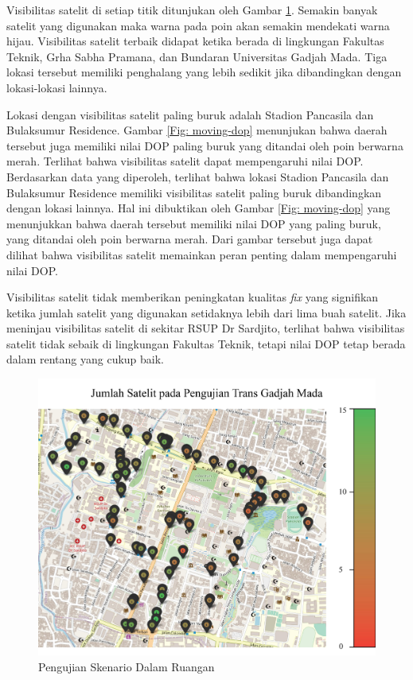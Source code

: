 Visibilitas satelit di setiap titik ditunjukan oleh Gambar \ref{Fig: moving-sats}. Semakin banyak satelit yang digunakan maka warna pada poin akan semakin mendekati warna hijau. Visibilitas satelit terbaik didapat ketika berada di lingkungan Fakultas Teknik, Grha Sabha Pramana, dan Bundaran Universitas Gadjah Mada. Tiga lokasi tersebut memiliki penghalang yang lebih sedikit jika dibandingkan dengan lokasi-lokasi lainnya.

Lokasi dengan visibilitas satelit paling buruk adalah Stadion Pancasila dan Bulaksumur Residence. Gambar \ref{Fig: moving-dop} menunjukan bahwa daerah tersebut juga memiliki nilai DOP paling buruk yang ditandai oleh poin berwarna merah. Terlihat bahwa visibilitas satelit dapat mempengaruhi nilai DOP. Berdasarkan data yang diperoleh, terlihat bahwa lokasi Stadion Pancasila dan Bulaksumur Residence memiliki visibilitas satelit paling buruk dibandingkan dengan lokasi lainnya. Hal ini dibuktikan oleh Gambar \ref{Fig: moving-dop} yang menunjukkan bahwa daerah tersebut memiliki nilai DOP yang paling buruk, yang ditandai oleh poin berwarna merah. Dari gambar tersebut juga dapat dilihat bahwa visibilitas satelit memainkan peran penting dalam mempengaruhi nilai DOP. 

Visibilitas satelit tidak memberikan peningkatan kualitas \textit{fix} yang signifikan ketika jumlah satelit yang digunakan setidaknya lebih dari lima buah satelit. Jika meninjau visibilitas satelit di sekitar RSUP Dr Sardjito, terlihat bahwa visibilitas satelit tidak sebaik di lingkungan Fakultas Teknik, tetapi nilai DOP tetap berada dalam rentang yang cukup baik.

\begin{figure}[H]
	\centering
	\includegraphics[width=12cm]{contents/chapter-4/pengujian-bergerak/moving-sats.jpg}
	\caption{Pengujian Skenario Dalam Ruangan}
	\label{Fig: moving-sats}
\end{figure}